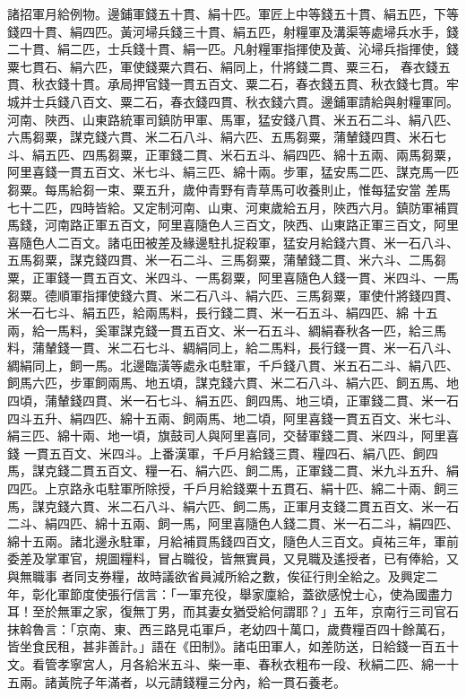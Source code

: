 \begin{pinyinscope}
 諸招軍月給例物。邊鋪軍錢五十貫、絹十匹。軍匠上中等錢五十貫、絹五匹，下等錢四十貫、絹四匹。黃河埽兵錢三十貫、絹五匹，射糧軍及溝渠等處埽兵水手，錢二十貫、絹二匹，士兵錢十貫、絹一匹。凡射糧軍指揮使及黃、沁埽兵指揮使，錢粟七貫石、絹六匹，軍使錢粟六貫石、絹同上，什將錢二貫、粟三石，
 春衣錢五貫、秋衣錢十貫。承局押官錢一貫五百文、粟二石，春衣錢五貫、秋衣錢七貫。牢城并士兵錢八百文、粟二石，春衣錢四貫、秋衣錢六貫。邊鋪軍請給與射糧軍同。河南、陜西、山東路統軍司鎮防甲軍、馬軍，猛安錢八貫、米五石二斗、絹八匹、六馬芻粟，謀克錢六貫、米二石八斗、絹六匹、五馬芻粟，蒲輦錢四貫、米石七斗、絹五匹、四馬芻粟，正軍錢二貫、米石五斗、絹四匹、綿十五兩、兩馬芻粟，阿里喜錢一貫五百文、米七斗、絹三匹、綿十兩。步軍，猛安馬二匹、謀克馬一匹芻粟。每馬給芻一束、粟五升，歲仲青野有青草馬可收養則止，惟每猛安當
 差馬七十二匹，四時皆給。又定制河南、山東、河東歲給五月，陜西六月。鎮防軍補買馬錢，河南路正軍五百文，阿里喜隨色人三百文，陜西、山東路正軍三百文，阿里喜隨色人二百文。諸屯田被差及緣邊駐扎捉殺軍，猛安月給錢六貫、米一石八斗、五馬芻粟，謀克錢四貫、米一石二斗、三馬芻粟，蒲輦錢二貫、米六斗、二馬芻粟，正軍錢一貫五百文、米四斗、一馬芻粟，阿里喜隨色人錢一貫、米四斗、一馬芻粟。德順軍指揮使錢六貫、米二石八斗、絹六匹、三馬芻粟，軍使什將錢四貫、米一石七斗、絹五匹，給兩馬料，長行錢二貫、米一石五斗、絹四匹、綿
 十五兩，給一馬料，奚軍謀克錢一貫五百文、米一石五斗、綢絹春秋各一匹，給三馬料，蒲輦錢一貫、米二石七斗、綢絹同上，給二馬料，長行錢一貫、米一石八斗、綢絹同上，飼一馬。北邊臨潢等處永屯駐軍，千戶錢八貫、米五石二斗、絹八匹、飼馬六匹，步軍飼兩馬、地五頃，謀克錢六貫、米二石八斗、絹六匹、飼五馬、地四頃，蒲輦錢四貫、米一石七斗、絹五匹、飼四馬、地三頃，正軍錢二貫、米一石四斗五升、絹四匹、綿十五兩、飼兩馬、地二頃，阿里喜錢一貫五百文、米七斗、絹三匹、綿十兩、地一頃，旗鼓司人與阿里喜同，交替軍錢二貫、米四斗，阿里喜錢
 一貫五百文、米四斗。上番漢軍，千戶月給錢三貫、糧四石、絹八匹、飼四馬，謀克錢二貫五百文、糧一石、絹六匹、飼二馬，正軍錢二貫、米九斗五升、絹四匹。上京路永屯駐軍所除授，千戶月給錢粟十五貫石、絹十匹、綿二十兩、飼三馬，謀克錢六貫、米二石八斗、絹六匹、飼二馬，正軍月支錢二貫五百文、米一石二斗、絹四匹、綿十五兩、飼一馬，阿里喜隨色人錢二貫、米一石二斗，絹四匹、綿十五兩。諸北邊永駐軍，月給補買馬錢四百文，隨色人三百文。貞祐三年，軍前委差及掌軍官，規圖糧料，冒占職役，皆無實員，又見職及遙授者，已有俸給，又與無職事
 者同支券糧，故時議欲省員減所給之數，俟征行則全給之。及興定二年，彰化軍節度使張行信言：「一軍充役，舉家廩給，蓋欲感悅士心，使為國盡力耳！至於無軍之家，復無丁男，而其妻女猶受給何謂耶？」五年，京南行三司官石抹斡魯言：「京南、東、西三路見屯軍戶，老幼四十萬口，歲費糧百四十餘萬石，皆坐食民租，甚非善計。」語在《田制》。諸屯田軍人，如差防送，日給錢一百五十文。看管孝寧宮人，月各給米五斗、柴一車、春秋衣粗布一段、秋絹二匹、綿一十五兩。諸黃院子年滿者，以元請錢糧三分內，給一貫石養老。



\end{pinyinscope}